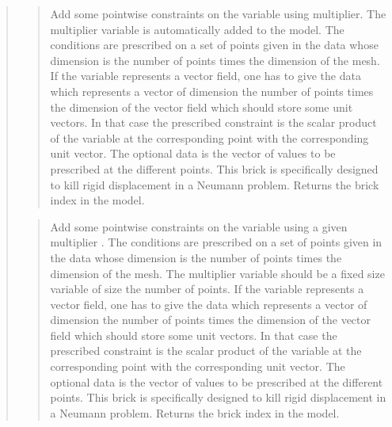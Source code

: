 \documentclass[a4paper,11pt,english]{sphinxmanual}
\begin{document}
\begin{quote}
\begin{quote}
\sphinxAtStartPar
Add some pointwise constraints on the variable  using
multiplier. The multiplier variable is automatically added to the model.
The conditions are prescribed on a set of points given in the data
 whose dimension is the number of points times the dimension
of the mesh.
If the variable represents a vector field, one has to give the data
 which represents a vector of dimension the number of
points times the dimension of the vector field which should store some
unit vectors. In that case the prescribed constraint is the scalar
product of the variable at the corresponding point with the corresponding
unit vector.
The optional data  is the vector of values to be prescribed
at the different points.
This brick is specifically designed to kill rigid displacement
in a Neumann problem.
Returns the brick index in the model.
\end{quote}

\sphinxAtStartPar
{}
\begin{quote}

\sphinxAtStartPar
Add some pointwise constraints on the variable  using a given
multiplier .
The conditions are prescribed on a set of points given in the data
 whose dimension is the number of points times the dimension
of the mesh.
The multiplier variable should be a fixed size variable of size the
number of points.
If the variable represents a vector field, one has to give the data
 which represents a vector of dimension the number of
points times the dimension of the vector field which should store some
unit vectors. In that case the prescribed constraint is the scalar
product of the variable at the corresponding point with the corresponding
unit vector.
The optional data  is the vector of values to be prescribed
at the different points.
This brick is specifically designed to kill rigid displacement
in a Neumann problem.
Returns the brick index in the model.
\end{quote}

\sphinxAtStartPar
{}
\begin{quote}


\end{quote}
\end{quote}
\end{document}
